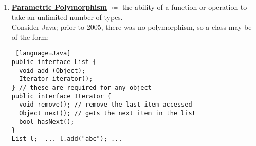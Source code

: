\documentclass[../../lecture_notes.tex]{subfiles}
\begin{document}
\begin{enumerate} [itemsep=0mm]
\begin{enumerate} [itemsep=0mm]
\begin{itemize} [itemsep=0mm]
					\item does not accept \{char, uchar, short, ushort\}.
				\end{itemize}
				We would thus expect to have 196 variations of the operator, but with coercion we only need 4.\\
				This is because coercion follows the following rules:
				\begin{itemize} [itemsep=0mm]
					\item if sizeof(T) < sizeof(int), then cast T to int.
					\item if sizeof($T_1$) > sizeof($T_2$), cast $T_1$ to type($T_2$).
					\item else, cast both numbers to unsigned.
				\end{itemize}
				This can result in some unexpected behavior:
				\begin{lstlisting}[language=C]
int i, j; 
long l; 
i = j + l; // trap
// sometimes the values can even change
int i = -1;
unsigned j = i; // changed value; j == UINT_MAX
unsigned short k = i; // loses info
assert(i == j);
// this can even happen implicitly on comparison
int i = -1;
unsigned z = 0;
assert(i < z); // EXCEPTION -- i is converted to unsigned
// even literals are not immune to this behavior
assert(-1 < 2^34); // EXCEPTION -- 2^34 is converted to int, where it overflows
assert(-2^32 < 0); // EXCEPTION -- 2^32 is converted to unsigned, then negated, 
		   // but since it is unsigned, it is still nonnegative
				\end{lstlisting}
		\end{enumerate}
		These two types of ad-hoc polymorphism can interact to cause undefined behavior:
		\begin{lstlisting} [language=C]
inf f(double x, int y);
int f(int x, double y);
f(3, 5); // which one does it call? 
		\end{lstlisting}
	\item \textbf{\underline{Parametric Polymorphism}}
		$\coloneqq$ the ability of a function or operation to take an unlimited number of types.\\
		Consider Java; prior to 2005, there was no polymorphism, so a class may be of the form:
		\begin{lstlisting} [language=Java]
public interface List {
  void add (Object);
  Iterator iterator();
} // these are required for any object
public interface Iterator {
  void remove(); // remove the last item accessed
  Object next(); // gets the next item in the list
  bool hasNext();
} 
List l;  ... l.add("abc"); ...

\end{lstlisting}
\end{enumerate}
\end{document}
